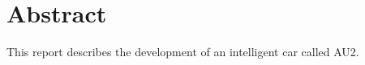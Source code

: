 \chapter{Abstract}
\label{ch:Abstract}

This report describes the development of an intelligent car called AU2. 

\clearpage